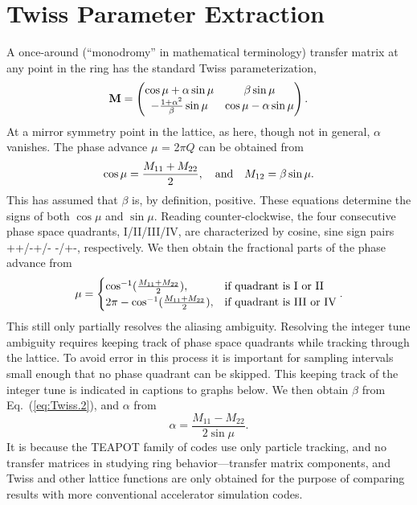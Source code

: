 \documentclass[12pt]{article}
\begin{document}
\section{Twiss Parameter Extraction}
A once-around (``monodromy'' in mathematical terminology) 
transfer matrix at any point in the ring has the standard Twiss parameterization,
%
\begin{equation}
 \bf{M} =
  \begin{pmatrix}
           \cos\mu + \alpha \sin\mu &            \beta \sin\mu \\
   -\frac{1+\alpha^2}{\beta}\sin\mu & \cos\mu - \alpha \sin\mu
  \end{pmatrix}.
\label{eq:Twiss.1}
\end{equation}
%
At a mirror symmetry point in the lattice, as here, though not in general, $\alpha$ vanishes.
The phase advance $\mu$ = 2$\pi Q$ can be obtained from
\begin{equation}
 \cos\mu=\frac{M_{11}+M_{22}}{2}, \quad \hbox{and} \quad M_{12}=\beta \sin\mu.
\label{eq:Twiss.2}
\end{equation}
This has assumed that $\beta$ is, by definition, positive.
These equations determine the signs of both $\cos\mu$ and $\sin\mu$. Reading counter-clockwise, the four 
consecutive phase space quadrants, I/II/III/IV, are characterized by cosine, sine sign pairs 
++/-+/- -/+-, respectively. We then obtain the fractional parts of the phase advance from 
%
\begin{equation}
 \mu = 
\begin{cases} 
       \cos^{-1}( \frac{M_{11}+M_{22}}{2} ), & \mbox{if } \textnormal{quadrant}\mbox{ is I or II} \\ 
  2\pi-\cos^{-1}( \frac{M_{11}+M_{22}}{2} ), & \mbox{if } \textnormal{quadrant}\mbox{ is III or IV} \end{cases}.
\label{eq:Twiss.3}
\end{equation}
%
This still only partially resolves the aliasing ambiguity. Resolving the integer tune ambiguity requires 
keeping track of phase space quadrants while tracking through the lattice. To avoid error in this
process it is important for sampling intervals small enough that no phase quadrant can be skipped.
This keeping track of the integer tune is indicated in captions 
to graphs below. We then obtain $\beta$ from Eq.~(\ref{eq:Twiss.2}), and $\alpha$ from 
%
\begin{equation}
 \alpha=\frac{M_{11}-M_{22}}{2\sin\mu}.
\label{eq:Twiss.4}
\end{equation}
%
It is because the TEAPOT family of codes use only particle tracking, and no transfer matrices in
studying ring behavior---transfer matrix components, and Twiss and other lattice functions are only 
obtained for the purpose of comparing results with more conventional accelerator simulation codes.
\end{document}
